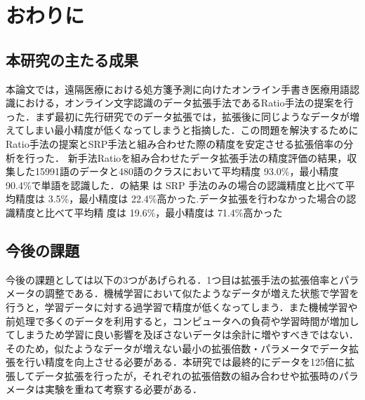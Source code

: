 
\chapter{おわりに}
\label{cha:conclu}

\section{本研究の主たる成果}
\label{sec:main-result}

本論文では，遠隔医療における処方箋予測に向けたオンライン手書き医療用語認識における，オンライン文字認識のデータ拡張手法であるRatio手法の提案を行った．まず最初に先行研究でのデータ拡張では，拡張後に同じようなデータが増えてしまい最小精度が低くなってしまうと指摘した．この問題を解決するためにRatio手法の提案とSRP手法と組み合わせた際の精度を安定させる拡張倍率の分析を行った．
新手法Ratioを組み合わせたデータ拡張手法の精度評価の結果，収集した15991語のデータと480語のクラスにおいて平均精度 93.0\%，最小精度 90.4\%で単語を認識した．の結果 は SRP 手法のみの場合の認識精度と比べて平均精度は 3.5\%，最小精度は 22.4\%高かった.データ拡張を行わなかった場合の認識精度と比べて平均精 度は 19.6\%，最小精度は 71.4\%高かった
\section{今後の課題}
\label{sec:future}
今後の課題としては以下の3つがあげられる．1つ目は拡張手法の拡張倍率とパラメータの調整である．機械学習において似たようなデータが増えた状態で学習を行うと，学習データに対する過学習で精度が低くなってしまう．また機械学習や前処理で多くのデータを利用すると，コンピュータへの負荷や学習時間が増加してしまうため学習に良い影響を及ぼさないデータは余計に増やすべきではない．そのため，似たようなデータが増えない最小の拡張倍数・パラメータでデータ拡張を行い精度を向上させる必要がある．本研究では最終的にデータを125倍に拡張してデータ拡張を行ったが，それぞれの拡張倍数の組み合わせや拡張時のパラメータは実験を重ねて考察する必要がある．


